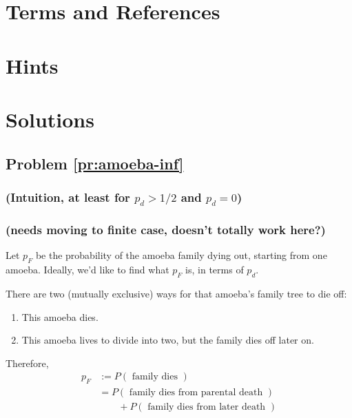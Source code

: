 
\newpage
\section{Terms and References}

\section{Hints}

\newpage
\section{Solutions}

\subsection{Problem \ref{pr:amoeba-inf}}



\subsubsection{(Intuition, at least for $p_d > 1/2$ and $p_d = 0$)}

\subsubsection{(needs moving to finite case, doesn't totally work here?)}

Let $p_F$ be the probability of the amoeba family dying out, starting from one amoeba. Ideally, we'd like to find what $p_F$ is, in terms of $p_d$. 

There are two (mutually exclusive) ways for that amoeba's family tree to die off: 
\begin{enumerate}
\item This amoeba dies.
\item This amoeba lives to divide into two, but the family dies off later on.
\end{enumerate} \hfill

Therefore, 
\begin{align*}
p_F &:= P(\text{ family dies }) \\
&= P(\text{ family dies from parental death }) \\
&\qquad + P(\text{ family dies from later death }) \\ %
\end{align*}


